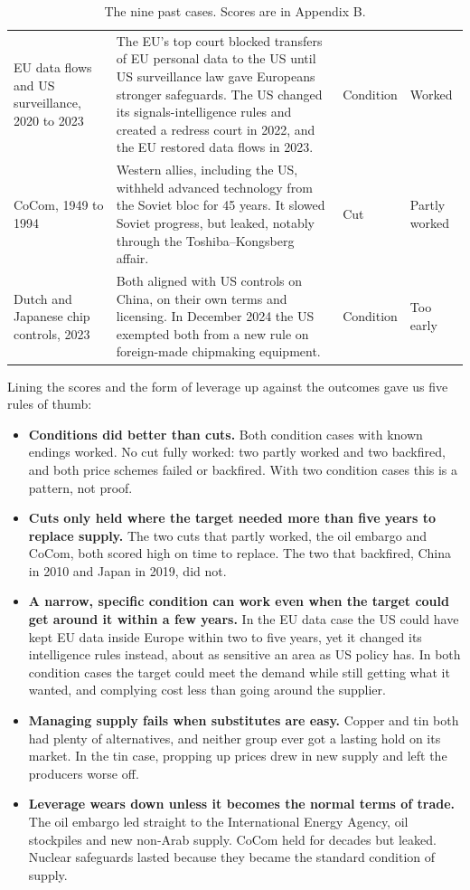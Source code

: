 \documentclass[11pt]{article}
\begin{document}
\begin{table}[htbp]
\begin{tabularx}{\linewidth}{@{}>{\raggedright\arraybackslash}p{3.0cm} X >{\raggedright\arraybackslash}p{1.6cm} >{\raggedright\arraybackslash}p{1.6cm}@{}}
EU data flows and US surveillance, 2020 to 2023 & The EU's top court blocked transfers of EU personal data to the US until US surveillance law gave Europeans stronger safeguards. The US changed its signals-intelligence rules and created a redress court in 2022, and the EU restored data flows in 2023. & Condition & Worked\\
CoCom, 1949 to 1994 & Western allies, including the US, withheld advanced technology from the Soviet bloc for 45 years. It slowed Soviet progress, but leaked, notably through the Toshiba--Kongsberg affair. & Cut & Partly worked\\
Dutch and Japanese chip controls, 2023 & Both aligned with US controls on China, on their own terms and licensing. In December 2024 the US exempted both from a new rule on foreign-made chipmaking equipment. & Condition & Too early\\
\bottomrule
\end{tabularx}
\caption{The nine past cases. Scores are in Appendix B.}
\label{tab:cases}
\end{table}

Lining the scores and the form of leverage up against the outcomes gave us five rules of thumb:

\begin{itemize}[leftmargin=*]
\item \textbf{Conditions did better than cuts.} Both condition cases with known endings worked. No cut fully worked: two partly worked and two backfired, and both price schemes failed or backfired. With two condition cases this is a pattern, not proof.
\item \textbf{Cuts only held where the target needed more than five years to replace supply.} The two cuts that partly worked, the oil embargo and CoCom, both scored high on time to replace. The two that backfired, China in 2010 and Japan in 2019, did not.
\item \textbf{A narrow, specific condition can work even when the target could get around it within a few years.} In the EU data case the US could have kept EU data inside Europe within two to five years, yet it changed its intelligence rules instead, about as sensitive an area as US policy has. In both condition cases the target could meet the demand while still getting what it wanted, and complying cost less than going around the supplier.
\item \textbf{Managing supply fails when substitutes are easy.} Copper and tin both had plenty of alternatives, and neither group ever got a lasting hold on its market. In the tin case, propping up prices drew in new supply and left the producers worse off.
\item \textbf{Leverage wears down unless it becomes the normal terms of trade.} The oil embargo led straight to the International Energy Agency, oil stockpiles and new non-Arab supply. CoCom held for decades but leaked. Nuclear safeguards lasted because they became the standard condition of supply.
\end{itemize}
\end{document}
